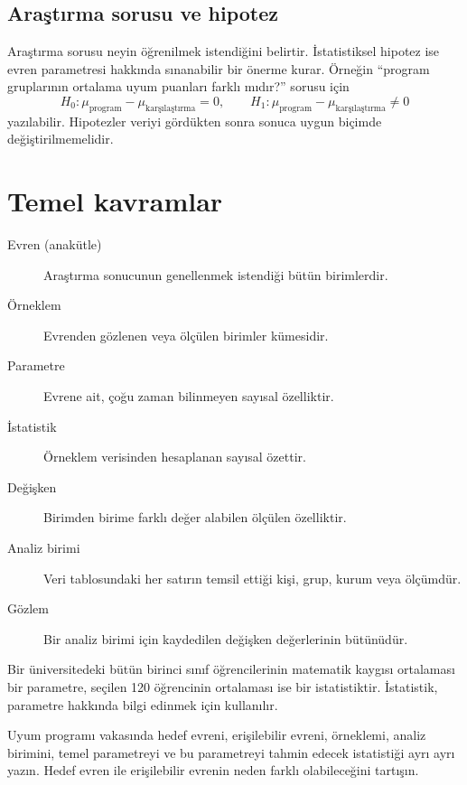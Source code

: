 \subsection{Araştırma sorusu ve hipotez}

Araştırma sorusu neyin öğrenilmek istendiğini belirtir. İstatistiksel hipotez
ise evren parametresi hakkında sınanabilir bir önerme kurar. Örneğin
``program gruplarının ortalama uyum puanları farklı mıdır?'' sorusu için
\[
H_0:\mu_{\text{program}}-\mu_{\text{karşılaştırma}}=0,
\qquad
H_1:\mu_{\text{program}}-\mu_{\text{karşılaştırma}}\ne0
\]
yazılabilir. Hipotezler veriyi gördükten sonra sonuca uygun biçimde
değiştirilmemelidir.

\section{Temel kavramlar}
\label{sec:population-parameter}

\begin{description}
  \item[Evren (anakütle)] Araştırma sonucunun genellenmek istendiği bütün birimlerdir.
  \item[Örneklem] Evrenden gözlenen veya ölçülen birimler kümesidir.
  \item[Parametre] Evrene ait, çoğu zaman bilinmeyen sayısal özelliktir.
  \item[İstatistik] Örneklem verisinden hesaplanan sayısal özettir.
  \item[Değişken] Birimden birime farklı değer alabilen ölçülen özelliktir.
  \item[Analiz birimi] Veri tablosundaki her satırın temsil ettiği kişi, grup, kurum veya ölçümdür.
  \item[Gözlem] Bir analiz birimi için kaydedilen değişken değerlerinin bütünüdür.
\end{description}

Bir üniversitedeki bütün birinci sınıf öğrencilerinin matematik kaygısı
ortalaması bir parametre, seçilen 120 öğrencinin ortalaması ise bir
istatistiktir. İstatistik, parametre hakkında bilgi edinmek için kullanılır.

\begin{etkinlik}
Uyum programı vakasında hedef evreni, erişilebilir evreni, örneklemi, analiz
birimini, temel parametreyi ve bu parametreyi tahmin edecek istatistiği ayrı
ayrı yazın. Hedef evren ile erişilebilir evrenin neden farklı olabileceğini
tartışın.
\end{etkinlik}


